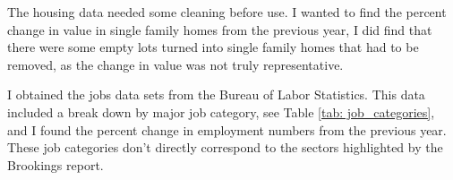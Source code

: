 \documentclass{article}
\begin{document}
\begin{table}[H]
    \centering
    \caption{Boise MLS Areas}
    \label{tab: mls_areas}
\end{table}
The housing data needed some cleaning before use. I wanted to find the percent change in value in single family homes from the previous year, I did find that there were some empty lots turned into single family homes that had to be removed, as the change in value was not truly representative.\par
I obtained the jobs data sets from the Bureau of Labor Statistics. This data included a break down by major job category, see Table \ref{tab: job_categories}, and I found the percent change in employment numbers from the previous year. These job categories don't directly correspond to the sectors highlighted by the Brookings report. 
\end{document}
